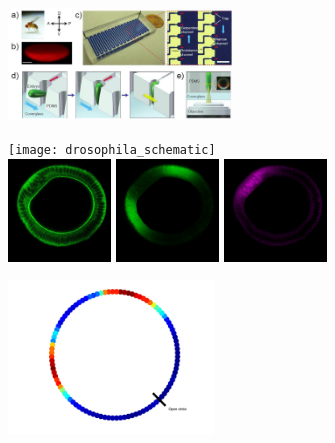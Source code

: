 \documentclass[10pt]{article}
\begin{document}
\begin{figure}[H]
\begin{center}
\begin{subfigure}{\textwidth}
\centering
\includegraphics[width=0.65\textwidth]{drosophila_imaging_setup}
\caption{}
\label{subfig:imaging_device}
\end{subfigure}
\begin{subfigure}{0.55\textwidth}
\texttt{[image: drosophila\_schematic]}\\
\includegraphics[width=0.3\textwidth]{drosophila_membrane}
\includegraphics[width=0.3\textwidth]{drosophila_dpERK}
\includegraphics[width=0.3\textwidth]{drosophila_DI}
\caption{}
\end{subfigure}
\begin{subfigure}{0.35\textwidth}
\centering
\includegraphics[width=0.6\textwidth]{circle_profile}\\

\end{subfigure}
\end{center}
\end{figure}
\end{document}
